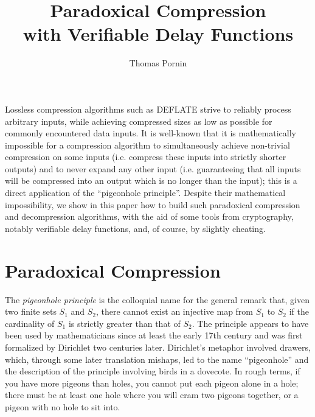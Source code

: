 \documentclass{llncs}
\makeatletter
\renewenvironment{abstract}{%
      \list{}{\advance\topsep by0.35cm\relax\small
      \leftmargin=1cm
      \labelwidth=\z@
      \listparindent=\z@
      \itemindent\listparindent
      \rightmargin\leftmargin}\item[\hskip\labelsep
                                    \textsf{\textbf{\abstractname}}]}
    {\endlist}
\makeatother
\begin{document}
\title{\textsf{Paradoxical Compression\\with Verifiable Delay Functions}}

\author{Thomas Pornin}

\maketitle
\noindent{}

\begin{abstract}
Lossless compression algorithms such as DEFLATE strive to reliably
process arbitrary inputs, while achieving compressed sizes as low as
possible for commonly encountered data inputs. It is well-known that it
is mathematically impossible for a compression algorithm to
simultaneously achieve non-trivial compression on some inputs (i.e.
compress these inputs into strictly shorter outputs) and to never expand
any other input (i.e. guaranteeing that all inputs will be compressed
into an output which is no longer than the input); this is a direct
application of the ``pigeonhole principle''. Despite their mathematical
impossibility, we show in this paper how to build such paradoxical
compression and decompression algorithms, with the aid of some tools
from cryptography, notably verifiable delay functions, and, of course,
by slightly cheating.
\end{abstract}


\section{Paradoxical Compression}\label{sec:intro}

The \emph{pigeonhole principle} is the colloquial name for the general
remark that, given two finite sets $S_1$ and $S_2$, there cannot exist
an injective map from $S_1$ to $S_2$ if the cardinality of $S_1$ is
strictly greater than that of $S_2$. The principle appears to have been
used by mathematicians since at least the early 17th
century\cite{Leu1622} and was first formalized by Dirichlet two
centuries later\cite{Dir1842}. Dirichlet's metaphor involved drawers,
which, through some later translation mishaps, led to the name
``pigeonhole'' and the description of the principle involving birds in a
dovecote\cite{RitHee2014}. In rough terms, if you have more pigeons than
holes, you cannot put each pigeon alone in a hole; there must be at
least one hole where you will cram two pigeons together, or a pigeon
with no hole to sit into.
\end{document}
